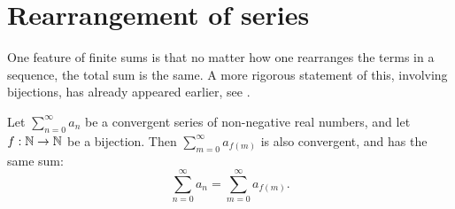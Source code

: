 \section{Rearrangement of series}\label{i:sec:7.4}

\begin{note}
  One feature of finite sums is that no matter how one rearranges the terms in a sequence, the total sum is the same.
  A more rigorous statement of this, involving bijections, has already appeared earlier, see .
\end{note}

\begin{prop}\label{i:7.4.1}
  Let \(\sum_{n = 0}^\infty a_n\) be a convergent series of non-negative real numbers, and let \(f : \mathbb{N} \to \mathbb{N}\) be a bijection.
  Then \(\sum_{m = 0}^\infty a_{f(m)}\) is also convergent, and has the same sum:
  \[
    \sum_{n = 0}^\infty a_n = \sum_{m = 0}^\infty a_{f(m)}.
  \]
\end{prop}

